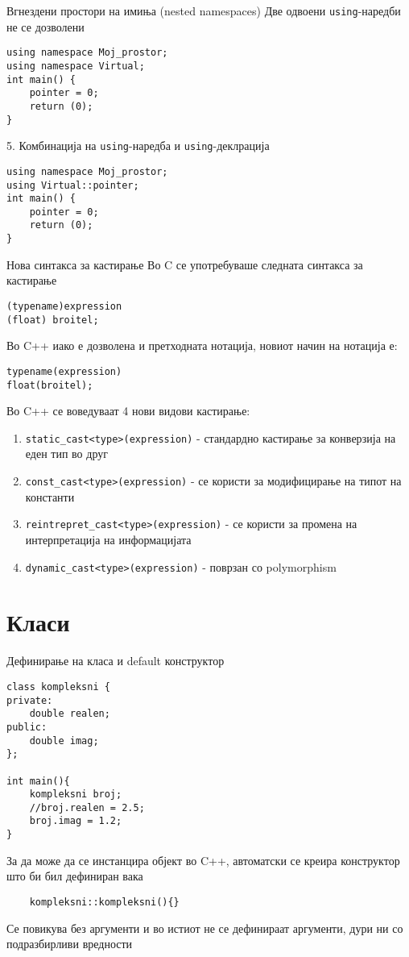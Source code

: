 \begin{frame}[fragile]{Вгнездени простори на имиња (nested namespaces)}
Две одвоени \texttt{using}-наредби не се дозволени
\begin{lstlisting}
using namespace Moj_prostor;
using namespace Virtual;
int main() {
    pointer = 0;
    return (0);
}
\end{lstlisting}
5. Комбинација на \texttt{using}-наредба и \texttt{using}-деклрација
\begin{lstlisting}
using namespace Moj_prostor;
using Virtual::pointer;
int main() {
    pointer = 0;
    return (0);
}
\end{lstlisting}
\end{frame}

\begin{frame}[fragile]{Нова синтакса за кастирање}
Во C се употребуваше следната синтакса за кастирање
\begin{lstlisting}
(typename)expression
(float) broitel;
\end{lstlisting}
Во C++ иако е дозволена и претходната нотација, новиот начин на нотација е:
\begin{lstlisting}
typename(expression)
float(broitel);
\end{lstlisting}
Во C++ се воведуваат 4 нови видови кастирање:
\begin{enumerate}
  \item \texttt{static\_cast<type>(expression)} - стандардно кастирање за
  конверзија на еден тип во друг
  \item \texttt{const\_cast<type>(expression)} - се користи за модифицирање на типот на
  константи
  \item \texttt{reintrepret\_cast<type>(expression)} - се користи за промена на
  интерпретација на информацијата
  \item \texttt{dynamic\_cast<type>(expression)} - поврзан со polymorphism
 
\end{enumerate}
\end{frame}

\section{Класи}
\begin{frame}[fragile]{Дефинирање на класа и default конструктор}
\begin{lstlisting}
class kompleksni {
private:
    double realen;
public:
    double imag;
};

int main(){
    kompleksni broj;
    //broj.realen = 2.5;
    broj.imag = 1.2;
}   
\end{lstlisting}
За да може да се инстанцира објект во C++, автоматски се креира конструктор што би бил дефиниран вака
\begin{lstlisting}
    kompleksni::kompleksni(){}
\end{lstlisting}
Се повикува без аргументи и во истиот не се дефинираат аргументи, дури ни со подразбирливи вредности

\end{frame}